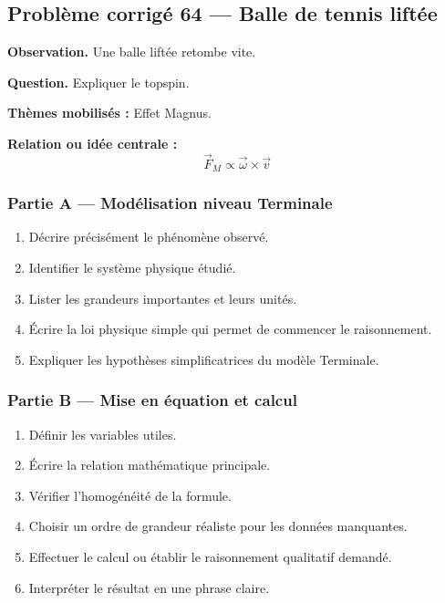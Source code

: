 \documentclass[11pt,a4paper]{article}
\begin{document}
\subsection{Problème corrigé 64 — Balle de tennis liftée}

\begin{exercicebox}
\textbf{Observation.} Une balle liftée retombe vite.

\medskip
\textbf{Question.} Expliquer le topspin.

\medskip
\textbf{Thèmes mobilisés :} Effet Magnus.

\medskip
\textbf{Relation ou idée centrale :}
\[
\vec F_M\propto\vec\omega\times\vec v
\]
\end{exercicebox}

\subsubsection*{Partie A — Modélisation niveau Terminale}

\begin{enumerate}
  \item Décrire précisément le phénomène observé.
  \item Identifier le système physique étudié.
  \item Lister les grandeurs importantes et leurs unités.
  \item Écrire la loi physique simple qui permet de commencer le raisonnement.
  \item Expliquer les hypothèses simplificatrices du modèle Terminale.
\end{enumerate}

\subsubsection*{Partie B — Mise en équation et calcul}

\begin{enumerate}
  \item Définir les variables utiles.
  \item Écrire la relation mathématique principale.
  \item Vérifier l'homogénéité de la formule.
  \item Choisir un ordre de grandeur réaliste pour les données manquantes.
  \item Effectuer le calcul ou établir le raisonnement qualitatif demandé.
  \item Interpréter le résultat en une phrase claire.
\end{enumerate}
\end{document}
